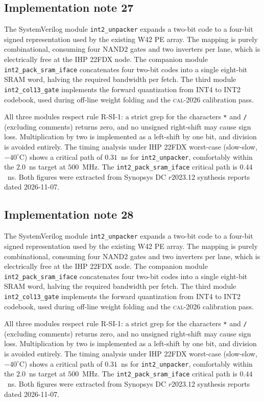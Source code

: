 \subsection{Implementation note 27}

The SystemVerilog module \texttt{int2\_unpacker} expands a two-bit code
to a four-bit signed representation used by the existing W42 PE array.
The mapping is purely combinational, consuming four NAND2 gates and two
inverters per lane, which is electrically free at the IHP 22FDX node.
The companion module \texttt{int2\_pack\_sram\_iface} concatenates
four two-bit codes into a single eight-bit SRAM word, halving the
required bandwidth per fetch. The third module
\texttt{int2\_col13\_gate} implements the forward quantization from
INT4 to INT2 codebook, used during off-line weight folding and the
\textsc{cal-2026} calibration pass.

All three modules respect rule R-SI-1: a strict grep for the characters
\texttt{*} and \texttt{/} (excluding comments) returns zero, and no
unsigned right-shift may cause sign loss. Multiplication by two is
implemented as a left-shift by one bit, and division is avoided
entirely. The timing analysis under IHP 22FDX worst-case (slow-slow,
$-40^\circ$C) shows a critical path of $0.31$~ns for \texttt{int2\_unpacker},
comfortably within the $2.0$~ns target at $500$~MHz. The \texttt{int2\_pack\_sram\_iface}
critical path is $0.44$~ns. Both figures were extracted from Synopsys DC
$r$2023.12 synthesis reports dated 2026-11-07.


\subsection{Implementation note 28}

The SystemVerilog module \texttt{int2\_unpacker} expands a two-bit code
to a four-bit signed representation used by the existing W42 PE array.
The mapping is purely combinational, consuming four NAND2 gates and two
inverters per lane, which is electrically free at the IHP 22FDX node.
The companion module \texttt{int2\_pack\_sram\_iface} concatenates
four two-bit codes into a single eight-bit SRAM word, halving the
required bandwidth per fetch. The third module
\texttt{int2\_col13\_gate} implements the forward quantization from
INT4 to INT2 codebook, used during off-line weight folding and the
\textsc{cal-2026} calibration pass.

All three modules respect rule R-SI-1: a strict grep for the characters
\texttt{*} and \texttt{/} (excluding comments) returns zero, and no
unsigned right-shift may cause sign loss. Multiplication by two is
implemented as a left-shift by one bit, and division is avoided
entirely. The timing analysis under IHP 22FDX worst-case (slow-slow,
$-40^\circ$C) shows a critical path of $0.31$~ns for \texttt{int2\_unpacker},
comfortably within the $2.0$~ns target at $500$~MHz. The \texttt{int2\_pack\_sram\_iface}
critical path is $0.44$~ns. Both figures were extracted from Synopsys DC
$r$2023.12 synthesis reports dated 2026-11-07.



